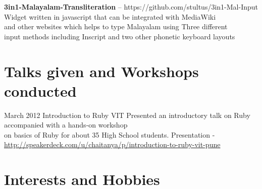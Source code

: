 \documentclass[11pt,a4paper]{moderncv}
\begin{document}
\cvlistitem
{\textbf{3in1-Malayalam-Transliteration} -- {\small https://github.com/stultus/3in1-Mal-Input}
  \\Widget written in javascript that can be integrated with MediaWiki \\
    and other websites which helps to type Malayalam using Three different\\
    input methods including Inscript and two other phonetic keyboard layouts
}





\section{Talks given and Workshops conducted}
\cventry
        {March 2012}
        {Introduction to Ruby}
        {VIT}
        {}
        {}
        {
         Presented an introductory talk on Ruby accompanied with a 
         hands-on workshop \\
         on basics of Ruby for about 35 High School students.
         Presentation - \url{http://speakerdeck.com/u/chaitanya/p/introduction-to-ruby-vit-pune}
        }



\section{Interests and Hobbies}

  
\end{document}
